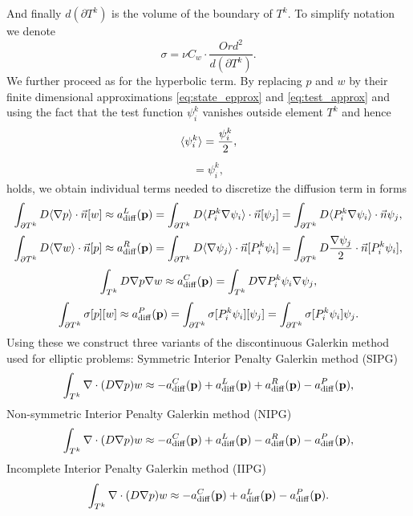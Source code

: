 And finally $d(\partial T^k)$ is the volume of the boundary of $T^k$. To
simplify notation
we denote
\begin{equation}
\label{eq:diff_penalty_sigma}
\sigma = \nu C_w \cdot \frac{Ord^2}{d(\partial T^k)}.
\end{equation}
We further proceed as for the hyperbolic term. By replacing $p$ and $w$ by their
finite dimensional approximations \eqref{eq:state_epprox} and
\eqref{eq:test_approx} and using the fact that the test function $\psi^k_i$
vanishes outside element $T^k$ and hence
\begin{eqnarray}
\langle\psi^k_i\rangle = \frac{\psi^k_i}{2},
\end{eqnarray}
\begin{eqnarray}
[\psi^k_i] = \psi^k_i,
\end{eqnarray}
holds, we obtain individual terms needed to discretize the diffusion term in forms
\begin{equation}
\label{eq:diff_left_approx}
\int_{\partial T^k} D \langle\nabla p\rangle \cdot \vec{n} [w]
\approx
a^L_\mathrm{diff}(\mathbf{p}) =
\int_{\partial T^k} D \langle P^k_i\nabla\psi_i\rangle \cdot \vec{n}[\psi_j] =
\int_{\partial T^k} D \langle P^k_i\nabla\psi_i\rangle \cdot \vec{n}\psi_j,
\end{equation}
\begin{equation}
\label{eq:diff_right_approx}
\int_{\partial T^k} D \langle\nabla w \rangle\cdot \vec{n} [p]
\approx
a^R_\mathrm{diff}(\mathbf{p}) =
\int_{\partial T^k} D \langle\nabla \psi_j \rangle\cdot \vec{n} [P^k_i\psi_i] =
\int_{\partial T^k} D \frac{\nabla \psi_j}{2}\cdot \vec{n}
[P^k_i\psi_i],
\end{equation}
\begin{equation}
\label{eq:diff_laplace_approx}
\int_{T^k} D\nabla p \nabla w
\approx
a^C_\mathrm{diff}(\mathbf{p})=
\int_{T^k} D\nabla P^k_i\psi_i \nabla \psi_j,
\end{equation}
\begin{equation}
\label{eq:diff_penalty_approx}
\int_{\partial T^k} \sigma [p][w]
\approx
a^P_\mathrm{diff}(\mathbf{p})=
\int_{\partial T^k} \sigma [P^k_i\psi_i][\psi_j]
= \int_{\partial T^k} \sigma [P^k_i\psi_i]\psi_j.
\end{equation}
Using these we construct three variants of the discontinuous Galerkin method used for
elliptic problems: Symmetric Interior Penalty Galerkin method (SIPG)
\begin{equation}
\label{eq:sipg}
\int_{T^k}\nabla\cdot(D\nabla p) w \approx - a^C_\mathrm{diff}(\mathbf{p})
+ a^L_\mathrm{diff}(\mathbf{p}) + a^R_\mathrm{diff}(\mathbf{p})
- a^P_\mathrm{diff}(\mathbf{p}),
\end{equation}
Non-symmetric Interior Penalty Galerkin method (NIPG)
\begin{equation}
\label{eq:nipg}
\int_{T^k}\nabla\cdot(D\nabla p) w \approx - a^C_\mathrm{diff}(\mathbf{p})
+ a^L_\mathrm{diff}(\mathbf{p}) - a^R_\mathrm{diff}(\mathbf{p})
- a^P_\mathrm{diff}(\mathbf{p}),
\end{equation}
Incomplete Interior Penalty Galerkin method (IIPG)
\begin{equation}
\label{eq:iipg}
\int_{T^k}\nabla\cdot(D\nabla p) w \approx - a^C_\mathrm{diff}(\mathbf{p})
+ a^L_\mathrm{diff}(\mathbf{p})
- a^P_\mathrm{diff}(\mathbf{p}).
\end{equation}

